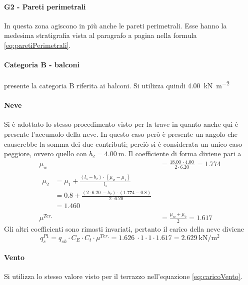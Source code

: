 \paragraph*{G2 - Pareti perimetrali}
In questa zona agiscono in più anche le pareti perimetrali.
Esse hanno la medesima stratigrafia vista al paragrafo a pagina \pageref{cap:paretiPerimetrali} nella formula \eqref{eq:paretiPerimetrali}.
\paragraph*{Categoria B - balconi} \e presente la categoria B riferita ai balconi. 
Si utilizza quindi \SI{4.00}{\kilo\newton\per\square\meter}
\paragraph*{Neve} Si è adottato lo stesso procedimento visto per la trave in quanto anche qui è presente l'accumolo della neve.
In questo caso però è presente un angolo che causerebbe la somma dei due  contributi; perciò si è considerata un unico caso peggiore, ovvero quello con $b_2  = \SI{4.00}{\meter}.$
Il coefficiente di forma diviene pari a 
\begin{align*}
	\mu_w &= \frac{\SI{18.00}{}\cdot\SI{4.00}{}}{2\cdot\SI{6.20}{}}=1.774\\
    \begin{split}
		\mu_2 &=\mu_1 + \frac{(l_s - b_2)\cdot (\mu_w-\mu_1)}{l_s} \\
		      &= 0.8+\frac{(2\cdot\SI{6.20}{}-b_2)\cdot(1.774-0.8)}{2\cdot\SI{6.20}{}}\\
		      &= 1.460
    \end{split}\\
	\mu^{Ter.}&= \frac{\mu_w + \mu_2}{2}=1.617
\end{align*}
Gli altri coefficienti sono rimasti invariati, pertanto il carico della neve diviene
\[
	q_s^{P1} = q_{sk} \cdot C_E \cdot C_t \cdot \mu^{Ter.} = \SI{1.626}{} \cdot 1 \cdot 1 \cdot 1.617 = \SI{2.629}{\kilo\newton\per\square\meter}
\]
\paragraph*{Vento} Si utilizza lo stesso valore visto per il terrazzo nell'equazione \eqref{eq:caricoVento}.

